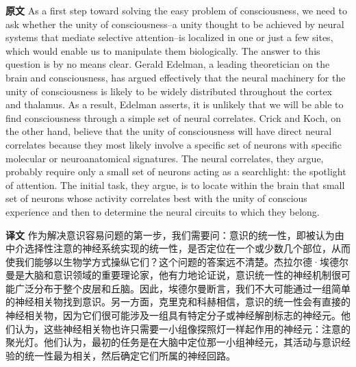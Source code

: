 \documentclass[UTF8,zihao=-4]{ctexart}
\newcommand{\BodyFont}{\fontsize{10.5pt}{15.5pt}\selectfont}
\newcommand{\origlabel}{\textbf{原文}\quad}
\newcommand{\translabel}{\textbf{译文}\quad}
\newenvironment{enblock}{\par\noindent\begingroup\BodyFont\origlabel}{\par\endgroup}
\newenvironment{zhblock}{\par\noindent\begingroup\BodyFont\translabel}{\par\endgroup\vspace{0.35em}}
\begin{document}
\begin{enblock}
As a first step toward solving the easy problem of consciousness, we need to ask whether the unity of consciousness--a unity thought to be achieved by neural systems that mediate selective attention--is localized in one or just a few sites, which would enable us to manipulate them biologically. The answer to this question is by no means clear. Gerald Edelman, a leading theoretician on the brain and consciousness, has argued effectively that the neural machinery for the unity of consciousness is likely to be widely distributed throughout the cortex and thalamus. As a result, Edelman asserts, it is unlikely that we will be able to find consciousness through a simple set of neural correlates. Crick and Koch, on the other hand, believe that the unity of consciousness will have direct neural correlates because they most likely involve a specific set of neurons with specific molecular or neuroanatomical signatures. The neural correlates, they argue, probably require only a small set of neurons acting as a searchlight: the spotlight of attention. The initial task, they argue, is to locate within the brain that small set of neurons whose activity correlates best with the unity of conscious experience and then to determine the neural circuits to which they belong.
\end{enblock}
\begin{zhblock}
作为解决意识容易问题的第一步，我们需要问：意识的统一性，即被认为由中介选择性注意的神经系统实现的统一性，是否定位在一个或少数几个部位，从而使我们能够以生物学方式操纵它们？这个问题的答案远不清楚。杰拉尔德·埃德尔曼是大脑和意识领域的重要理论家，他有力地论证说，意识统一性的神经机制很可能广泛分布于整个皮层和丘脑。因此，埃德尔曼断言，我们不大可能通过一组简单的神经相关物找到意识。另一方面，克里克和科赫相信，意识的统一性会有直接的神经相关物，因为它们很可能涉及一组具有特定分子或神经解剖标志的神经元。他们认为，这些神经相关物也许只需要一小组像探照灯一样起作用的神经元：注意的聚光灯。他们认为，最初的任务是在大脑中定位那一小组神经元，其活动与意识经验的统一性最为相关，然后确定它们所属的神经回路。\end{zhblock}
\end{document}
